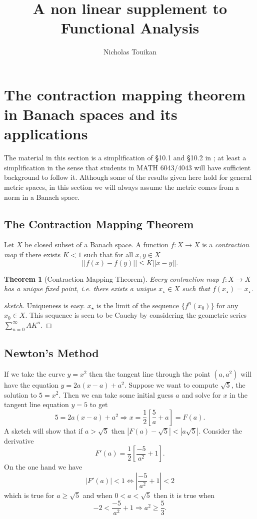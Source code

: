 \documentclass[10pt]{article}
\title{A non linear supplement to Functional Analysis}
\author{Nicholas Touikan}
\newtheorem{thm}{Theorem}[section]
\theoremstyle{definition}
\theoremstyle{remark}
\begin{document}
\maketitle

\section{The contraction mapping theorem in Banach spaces and its applications}

The material in this section is a simplification of \S 10.1 and \S 10.2 in \cite{Krantz}; at least a simplification in the sense that students in MATH 6043/4043 will have sufficient background to follow it. Although some of the results given here hold for general metric spaces, in this section we will always assume the metric comes from a norm in a Banach space.

\subsection{The Contraction Mapping Theorem}
Let $X$ be closed subset of a Banach space. A function $f:X\to X$ is a \emph{contraction map} if there exists $K<1$ such that for all $x,y \in X$\[
  ||f(x)-f(y)|| \leq K||x-y||.
\]

\begin{thm}[Contraction Mapping Theorem]\label{thm:contraction}
  Every contraction map $f:X\to X$ has a unique fixed point, i.e. there exists a unique $x_\star \in X$ such that $f(x_\star)=x_\star$. 
\end{thm}
\begin{proof}[sketch]
  Uniqueness is easy. $x_\star$ is the limit of the sequence $\{f^n(x_0)\}$ for any $x_0 \in X$. This sequence is seen to be Cauchy by considering the geometric series $\sum_{n=0}^\infty AK^n$.
\end{proof}


\subsection{Newton's Method}
If we take the curve $y=x^2$ then the tangent line through the point $(a,a^2)$ will have the equation $y = 2a(x-a)+a^2$. Suppose we want to compute $\sqrt 5$, the solution to $5=x^2$. Then we can take some initial guess $a$ and solve for $x$ in the tangent line equation $y=5$ to get\[
  5 = 2a(x-a)+a^2 \Rightarrow x = \frac{1}{2}\left[\frac 5 a + a\right]=F(a).
\] A sketch will show that if $a>\sqrt 5$ then $|F(a)-\sqrt 5|< |a\sqrt 5|$. Consider the derivative\[
  F'(a) = \frac 1 2 \left[\frac{-5}{a^2}+1\right].
\] On the one hand we have \[
|F'(a)|<1 \Leftrightarrow |\frac{-5}{a^2}+1|< 2 
\] which is true for $a \geq \sqrt 5$ and when $0<a < \sqrt 5$ then it is true when \[
  -2 < \frac{-5}{a^2}+1 \Rightarrow a^2 \geq \frac 5 3.
  \]
\end{document}
